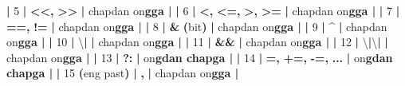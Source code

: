 \documentclass[a4paper,11pt,twoside,openright]{book}
\newenvironment{Shaded}{\begin{snugshade}}{\end{snugshade}}
\newcommand{\CharTok}[1]{\textcolor[rgb]{0.31,0.60,0.02}{#1}}
\newcommand{\DecValTok}[1]{\textcolor[rgb]{0.00,0.00,0.81}{#1}}
\newcommand{\ErrorTok}[1]{\textcolor[rgb]{0.64,0.00,0.00}{\textbf{#1}}}
\newcommand{\NormalTok}[1]{#1}
\newcommand{\OperatorTok}[1]{\textcolor[rgb]{0.81,0.36,0.00}{\textbf{#1}}}
\begin{document}
\begin{Shaded}
\begin{Highlighting}[]
\OperatorTok{|} \DecValTok{5} \OperatorTok{|} \ErrorTok{\textasciigrave{}}\OperatorTok{\textless{}\textless{}}\ErrorTok{\textasciigrave{}}\OperatorTok{,} \ErrorTok{\textasciigrave{}}\OperatorTok{\textgreater{}\textgreater{}}\ErrorTok{\textasciigrave{}} \OperatorTok{|}\NormalTok{ chapdan o}\CharTok{\textquotesingle{}n}\ErrorTok{gga |}
\OperatorTok{|} \DecValTok{6} \OperatorTok{|} \ErrorTok{\textasciigrave{}}\OperatorTok{\textless{}}\ErrorTok{\textasciigrave{}}\OperatorTok{,} \ErrorTok{\textasciigrave{}}\OperatorTok{\textless{}=}\ErrorTok{\textasciigrave{}}\OperatorTok{,} \ErrorTok{\textasciigrave{}}\OperatorTok{\textgreater{}}\ErrorTok{\textasciigrave{}}\OperatorTok{,} \ErrorTok{\textasciigrave{}}\OperatorTok{\textgreater{}=}\ErrorTok{\textasciigrave{}} \OperatorTok{|}\NormalTok{ chapdan o}\CharTok{\textquotesingle{}n}\ErrorTok{gga |}
\OperatorTok{|} \DecValTok{7} \OperatorTok{|} \ErrorTok{\textasciigrave{}}\OperatorTok{==}\ErrorTok{\textasciigrave{}}\OperatorTok{,} \ErrorTok{\textasciigrave{}}\OperatorTok{!=}\ErrorTok{\textasciigrave{}} \OperatorTok{|}\NormalTok{ chapdan o}\CharTok{\textquotesingle{}n}\ErrorTok{gga |}
\OperatorTok{|} \DecValTok{8} \OperatorTok{|} \ErrorTok{\textasciigrave{}}\OperatorTok{\&}\ErrorTok{\textasciigrave{}} \OperatorTok{(}\NormalTok{bit}\OperatorTok{)} \OperatorTok{|}\NormalTok{ chapdan o}\CharTok{\textquotesingle{}n}\ErrorTok{gga |}
\OperatorTok{|} \DecValTok{9} \OperatorTok{|} \ErrorTok{\textasciigrave{}}\OperatorTok{\^{}}\ErrorTok{\textasciigrave{}} \OperatorTok{|}\NormalTok{ chapdan o}\CharTok{\textquotesingle{}n}\ErrorTok{gga |}
\OperatorTok{|} \DecValTok{10} \OperatorTok{|} \ErrorTok{\textasciigrave{}}\NormalTok{\textbackslash{}}\OperatorTok{|}\ErrorTok{\textasciigrave{}} \OperatorTok{|}\NormalTok{ chapdan o}\CharTok{\textquotesingle{}n}\ErrorTok{gga |}
\OperatorTok{|} \DecValTok{11} \OperatorTok{|} \ErrorTok{\textasciigrave{}}\OperatorTok{\&\&}\ErrorTok{\textasciigrave{}} \OperatorTok{|}\NormalTok{ chapdan o}\CharTok{\textquotesingle{}n}\ErrorTok{gga |}
\OperatorTok{|} \DecValTok{12} \OperatorTok{|} \ErrorTok{\textasciigrave{}}\NormalTok{\textbackslash{}}\OperatorTok{|}\NormalTok{\textbackslash{}}\OperatorTok{|}\ErrorTok{\textasciigrave{}} \OperatorTok{|}\NormalTok{ chapdan o}\CharTok{\textquotesingle{}n}\ErrorTok{gga |}
\OperatorTok{|} \DecValTok{13} \OperatorTok{|} \ErrorTok{\textasciigrave{}}\OperatorTok{?:}\ErrorTok{\textasciigrave{}} \OperatorTok{|}\NormalTok{ o}\CharTok{\textquotesingle{}n}\ErrorTok{gdan chapga |}
\OperatorTok{|} \DecValTok{14} \OperatorTok{|} \ErrorTok{\textasciigrave{}}\OperatorTok{=}\ErrorTok{\textasciigrave{}}\OperatorTok{,} \ErrorTok{\textasciigrave{}}\OperatorTok{+=}\ErrorTok{\textasciigrave{}}\OperatorTok{,} \ErrorTok{\textasciigrave{}}\OperatorTok{{-}=}\ErrorTok{\textasciigrave{}}\OperatorTok{,} \OperatorTok{...} \OperatorTok{|}\NormalTok{ o}\CharTok{\textquotesingle{}n}\ErrorTok{gdan chapga |}
\OperatorTok{|} \DecValTok{15} \OperatorTok{(}\NormalTok{eng past}\OperatorTok{)} \OperatorTok{|} \ErrorTok{\textasciigrave{}}\OperatorTok{,}\ErrorTok{\textasciigrave{}} \OperatorTok{|}\NormalTok{ chapdan o}\CharTok{\textquotesingle{}n}\ErrorTok{gga |}


\end{Highlighting}
\end{Shaded}
\end{document}
